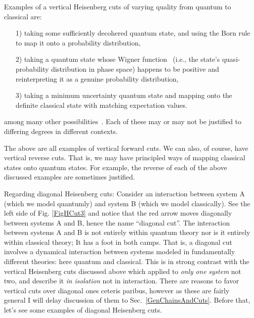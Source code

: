 \documentclass[12pt,prd,superscriptaddress,floatfix,amsmath,amssymb,amsfonts,nofootinbib]{revtex4-2}
\begin{document}
Examples of a vertical Heisenberg cuts of varying quality from quantum to classical are:
\begin{enumerate}
    \item[1)] taking some sufficiently decohered quantum state, and using the Born rule to map it onto a probability distribution,
    \item[2)] taking a quantum state whose Wigner function~\cite{QMPhaseSpace} (i.e., the state's quasi-probability distribution in phase space) happens to be positive and reinterpreting it as a genuine probability distribution,
    \item[3)] taking a minimum uncertainty quantum state and mapping onto the definite classical state with matching expectation values.
\end{enumerate}
among many other possibilities~\cite{Rosaler}. Each of these may or may not be justified to differing degrees in different contexts. 

The above are all examples of vertical forward cuts. We can also, of course, have vertical reverse cuts. That is, we may have principled ways of mapping classical states onto quantum states. For example, the reverse of each of the above discussed examples are sometimes justified.

Regarding diagonal Heisenberg cuts: Consider an interaction between system A (which we model quantumly) and system B (which we model classically). See the left side of Fig. \ref{FigHCut3} and notice that the red arrow moves diagonally between systems A and B, hence the name ``diagonal cut''. The interaction between systems A and B is not entirely within quantum theory nor is it entirely within classical theory; It has a foot in both camps. That is, a diagonal cut involves a dynamical interaction between systems modeled in fundamentally different theories: here quantum and classical. This is in strong contrast with the vertical Heisenberg cuts discussed above which applied to \textit{only one system} not two, and describe it \textit{in isolation} not in interaction. There are reasons to favor vertical cuts over diagonal ones ceteris paribus, however as these are fairly general I will delay discussion of them to Sec.~\ref{GenChainsAndCuts}. Before that, let's see some examples of diagonal Heisenberg cuts. 
\end{document}
